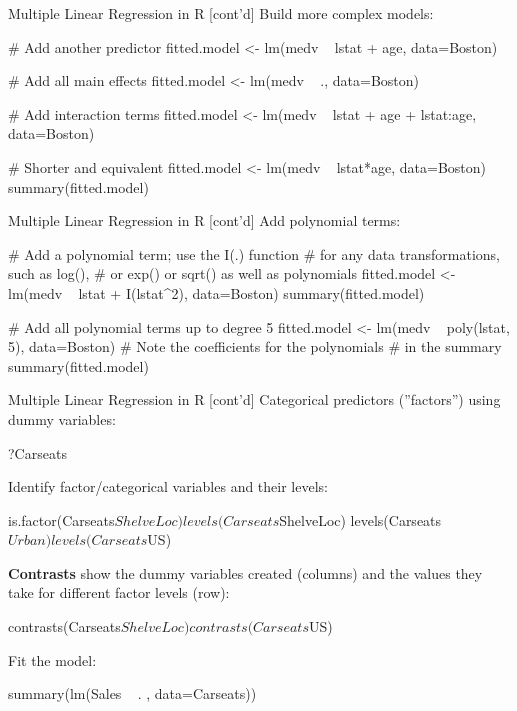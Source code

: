 \documentclass[ignorenonframetext,xcolor=x11names]{beamer}
\begin{document}
\begin{frame}[fragile]{Multiple Linear Regression in R \small [cont'd]}
Build more complex models:
\begin{Rcode}
# Add another predictor
fitted.model <- lm(medv ~ lstat + age, data=Boston)

# Add all main effects
fitted.model <- lm(medv ~ ., data=Boston)

# Add interaction terms
fitted.model <- lm(medv ~ lstat + age + lstat:age, 
   data=Boston)
   
# Shorter and equivalent
fitted.model <- lm(medv ~ lstat*age, data=Boston)
summary(fitted.model)
\end{Rcode}
\end{frame}

\begin{frame}[fragile]{Multiple Linear Regression in R \small [cont'd]}
Add polynomial terms:
\begin{Rcode}
# Add a polynomial term; use the I(.) function
# for any data transformations, such as log(),
# or exp() or sqrt() as well as polynomials
fitted.model <- lm(medv ~ lstat + I(lstat^2), 
   data=Boston)
summary(fitted.model)

# Add all polynomial terms up to degree 5
fitted.model <- lm(medv ~ poly(lstat, 5), data=Boston)
# Note the coefficients for the polynomials 
# in the summary
summary(fitted.model)
\end{Rcode}
\end{frame}

\begin{frame}[fragile]{Multiple Linear Regression in R \small [cont'd]}
Categorical predictors (''factors'') using dummy variables:
\begin{Rcode}
?Carseats
\end{Rcode}
Identify factor/categorical variables and their levels:
\begin{Rcode}
is.factor(Carseats$ShelveLoc)
levels(Carseats$ShelveLoc)
levels(Carseats$Urban)
levels(Carseats$US)
\end{Rcode}
\textbf{Contrasts} show the dummy variables created (columns) and the values they take for different  factor levels (row):
\begin{Rcode}
contrasts(Carseats$ShelveLoc)
contrasts(Carseats$US)
\end{Rcode}
Fit the model:
\begin{Rcode}
summary(lm(Sales ~ . , data=Carseats))
\end{Rcode}
\end{frame}
\end{document}
